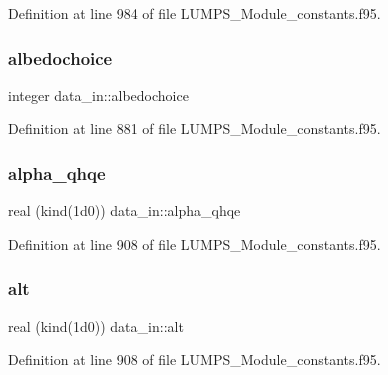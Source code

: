 Definition at line 984 of file L\+U\+M\+P\+S\+\_\+\+Module\+\_\+constants.\+f95.

\mbox{\label{namespacedata__in_a95db274f3821ba4b3b2799481c2484f7}} 
\subsubsection{\texorpdfstring{albedochoice}{albedochoice}}
{\footnotesize\ttfamily integer data\+\_\+in\+::albedochoice}



Definition at line 881 of file L\+U\+M\+P\+S\+\_\+\+Module\+\_\+constants.\+f95.

\mbox{\label{namespacedata__in_a6ecf207ff2ecfcb35e223ad4e761ff9b}} 
\subsubsection{\texorpdfstring{alpha\+\_\+qhqe}{alpha\_qhqe}}
{\footnotesize\ttfamily real (kind(1d0)) data\+\_\+in\+::alpha\+\_\+qhqe}



Definition at line 908 of file L\+U\+M\+P\+S\+\_\+\+Module\+\_\+constants.\+f95.

\mbox{\label{namespacedata__in_a1f542f63d48efee0cd1e356f9f3ea1cf}} 
\subsubsection{\texorpdfstring{alt}{alt}}
{\footnotesize\ttfamily real (kind(1d0)) data\+\_\+in\+::alt}



Definition at line 908 of file L\+U\+M\+P\+S\+\_\+\+Module\+\_\+constants.\+f95.

\mbox{\label{namespacedata__in_a6bf8149cf01d75c9bfb8b7aa575b98c3}} 
